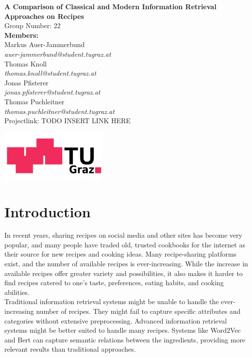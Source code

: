 \documentclass[a4paper,12pt]{article}
\begin{document}
\begin{titlepage}
    \centering
    \vspace*{1in} %
    \Huge %
    \textbf{A Comparison of Classical and Modern Information Retrieval Approaches on Recipes} \\[1.5cm] %
    \LARGE %
    Group Number: 22 \\[1.5cm]
    \Large %
    \textbf{Members:} \\
    Markus Auer-Jammerbund \\ \textit{auer-jammerbund@student.tugraz.at} \\
    Thomas Knoll \\ \textit{thomas.knoll@student.tugraz.at} \\
    Jonas Pfisterer \\ \textit{jonas.pfisterer@student.tugraz.at} \\
    Thomas Puchleitner \\ \textit{thomas.puchleitner@student.tugraz.at} \\   [1.5cm] 
    Projectlink: TODO INSERT LINK HERE 

    \includegraphics[width=0.4\textwidth]{2560px-TU_Graz.svg.png}
    
\end{titlepage}

\section{Introduction}
In recent years, sharing recipes on social media and other sites has become very popular, and many people have traded old, trusted cookbooks for the internet as their source for new recipes and cooking ideas.
Many recipe-sharing platforms exist, and the number of available recipes is ever-increasing.
While the increase in available recipes offer greater variety and possibilities, it also makes it harder to find recipes catered to one's taste, preferences, eating habits, and cooking abilities. \\

Traditional information retrieval systems might be unable to handle the ever-increasing number of recipes.
They might fail to capture specific attributes and categories without extensive preprocessing.
Advanced information retrieval systems might be better suited to handle many recipes.
Systems like Word2Vec and Bert can capture semantic relations between the ingredients, providing more relevant results than traditional approaches. \\
\end{document}

